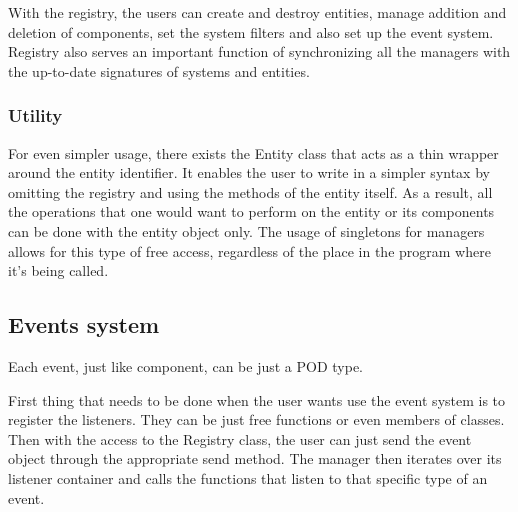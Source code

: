\documentclass[12pt, english]{article}
\begin{document}
With the registry, the users can create and destroy entities, manage addition
and deletion of components, set the system filters and also set up the event
system. Registry also serves an important function of synchronizing all the
managers with the up-to-date signatures of systems and entities.

\subsubsection{Utility}
For even simpler usage, there exists the Entity class that acts as a thin
wrapper around the entity identifier. It enables the user to write in a simpler
syntax by omitting the registry and using the methods of the entity itself. As
a result, all the operations that one would want to perform on the entity or
its components can be done with the entity object only. The usage of singletons
for managers allows for this type of free access, regardless of the place in
the program where it's being called.

\subsection{Events system}
Each event, just like component, can be just a POD type.

First thing that needs to be done when the user wants use the event system is
to register the listeners. They can be just free functions or even members of
classes. Then with the access to the Registry class, the user can just send the
event object through the appropriate send method. The manager then iterates
over its listener container and calls the functions that listen to that
specific type of an event.
\end{document}
